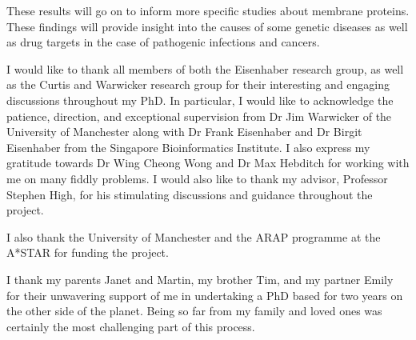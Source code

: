 \documentclass[12pt,PhD,twoside]{muthesis}
\begin{document}
These results will go on to inform more specific studies about membrane proteins.
These findings will provide insight into the causes of some genetic diseases as well as drug targets in the case of pathogenic infections and cancers.






\afterabstract{} %

I would like to thank all members of both the Eisenhaber research group, as well as the Curtis and Warwicker research group for their interesting and engaging discussions throughout my PhD.
In particular, I would like to acknowledge the patience, direction, and exceptional supervision from Dr Jim Warwicker of the University of Manchester along with Dr Frank Eisenhaber and Dr Birgit Eisenhaber from the Singapore Bioinformatics Institute.
I also express my gratitude towards Dr Wing Cheong Wong and Dr Max Hebditch for working with me on many fiddly problems.
I would also like to thank my advisor, Professor Stephen High, for his stimulating discussions and guidance throughout the project.

I also thank the University of Manchester and the ARAP programme at the A*STAR for funding the project.

I thank my parents Janet and Martin, my brother Tim, and my partner Emily for their unwavering support of me in undertaking a PhD based for two years on the other side of the planet.
Being so far from my family and loved ones was certainly the most challenging part of this process.



\end{document}
